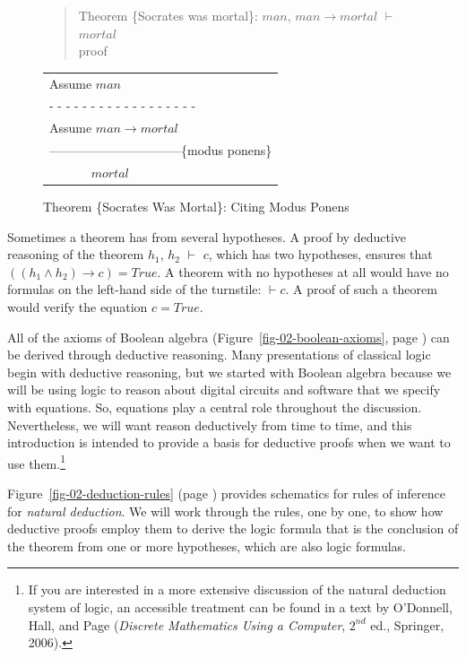 \begin{figure}
\begin{quote}
Theorem \{Socrates was mortal\}: $man$, $man \rightarrow mortal$ $\vdash$ $mortal$ \\
proof
\end{quote}
\begin{center}
\begin{tabular}{l}
Assume $man$                    \\
 - - - - - - - - - - - - - - - - - -\\
Assume $man \rightarrow mortal$ \\
--------------------------------\{modus ponens\} \\
~~~~~~ $mortal$                 \\
\end{tabular}
\end{center}
\caption{Theorem \{Socrates Was Mortal\}: Citing Modus Ponens}
\label{fig:socrates-proof}
\end{figure}

Sometimes a theorem has from several hypotheses.
A proof by deductive reasoning of the theorem
$h_1$, $h_2$ $\vdash$ $c$,
which has two hypotheses,
ensures that
$((h_1 \wedge h_2) \rightarrow c) = True$.
A theorem with no hypotheses at all
would have no formulas on the left-hand side of the turnstile:
$\vdash c$.
A proof of such a theorem would
verify the equation $c = True$.

All of the axioms of Boolean algebra
(Figure~\ref{fig-02-boolean-axioms}, page \pageref{fig-02-boolean-axioms})
can be derived through deductive reasoning.
Many presentations of classical logic begin with deductive reasoning,
but we started with Boolean algebra
because we will be using logic to reason about
digital circuits and software that we
specify with equations.
So, equations play a central role throughout the discussion.
Nevertheless, we will want reason deductively from time to time,
and this introduction is intended to provide a basis for
deductive proofs when we want to use them.\footnote{If
you are interested in a more extensive discussion of the natural deduction
system of logic, an accessible treatment can be found
in a text by O'Donnell, Hall, and Page
(\emph{Discrete Mathematics Using a Computer}, $2^{nd}$ ed., Springer, 2006).}

Figure~\ref{fig-02-deduction-rules} (page \pageref{fig-02-deduction-rules})
provides schematics for rules of inference for \emph{natural deduction}.
We will work through the rules, one by one,
to show how deductive proofs employ
them to derive the logic formula that is the conclusion of the theorem
from one or more hypotheses, which are also logic formulas.

